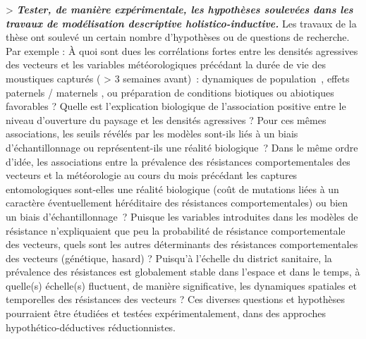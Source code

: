 \documentclass[12pt,twoside]{reedthesis}
\begin{document}
\textgreater{} \textbf{\emph{Tester, de manière expérimentale, les hypothèses soulevées dans les travaux de modélisation descriptive holistico-inductive.}} Les travaux de la thèse ont soulevé un certain nombre d'hypothèses ou de questions de recherche. Par exemple : À quoi sont dues les corrélations fortes entre les densités agressives des vecteurs et les variables météorologiques précédant la durée de vie des moustiques capturés ( \textgreater{} 3 semaines avant)~: dynamiques de population~, effets paternels / maternels , ou préparation de conditions biotiques ou abiotiques favorables ? Quelle est l'explication biologique de l'association positive entre le niveau d'ouverture du paysage et les densités agressives ? Pour ces mêmes associations, les seuils révélés par les modèles sont-ils liés à un biais d'échantillonnage ou représentent-ils une réalité biologique~? Dans le même ordre d'idée, les associations entre la prévalence des résistances comportementales des vecteurs et la météorologie au cours du mois précédant les captures entomologiques sont-elles une réalité biologique (coût de mutations liées à un caractère éventuellement héréditaire des résistances comportementales) ou bien un biais d'échantillonnage~? Puisque les variables introduites dans les modèles de résistance n'expliquaient que peu la probabilité de résistance comportementale des vecteurs, quels sont les autres déterminants des résistances comportementales des vecteurs (génétique, hasard) ? Puisqu'à l'échelle du district sanitaire, la prévalence des résistances est globalement stable dans l'espace et dans le temps, à quelle(s) échelle(s) fluctuent, de manière significative, les dynamiques spatiales et temporelles des résistances des vecteurs ? Ces diverses questions et hypothèses pourraient être étudiées et testées expérimentalement, dans des approches hypothético-déductives réductionnistes.\\
\end{document}
